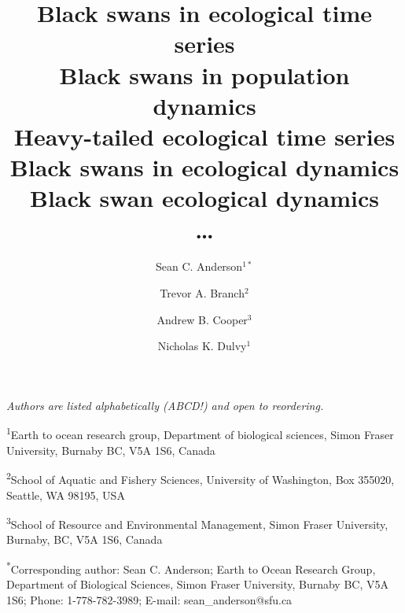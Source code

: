 \documentclass[12pt]{article}
\title{Black swans in ecological time series\\
  Black swans in population dynamics\\
  Heavy-tailed ecological time series\\
  Black swans in ecological dynamics\\
  Black swan ecological dynamics\\
  \ldots}
\author{
Sean C. Anderson$^{1\ast}$ \and
Trevor A. Branch$^2$ \and
Andrew B. Cooper$^3$ \and
Nicholas K. Dulvy$^1$
}
\date{}
\begin{document}
\maketitle
\onehalfspacing


\noindent
\emph{Authors are listed alphabetically (ABCD!) and open to reordering.}

\noindent
\textsuperscript{1}Earth to ocean research group,
Department of biological sciences,
Simon Fraser University, Burnaby BC, V5A 1S6, Canada

\noindent
\textsuperscript{2}School of Aquatic and Fishery Sciences,
University of Washington, Box 355020, Seattle, WA 98195, USA

\noindent
\textsuperscript{3}School of Resource and Environmental Management,
Simon Fraser University, Burnaby, BC, V5A 1S6, Canada

\noindent
\textsuperscript{*}Corresponding author: Sean C. Anderson;
Earth to Ocean Research Group,
Department of Biological Sciences,
Simon Fraser University,
Burnaby BC, V5A 1S6;
Phone: 1-778-782-3989;
E-mail: sean\_anderson@sfu.ca

\thispagestyle{empty}

\linenumbers




\end{document}
